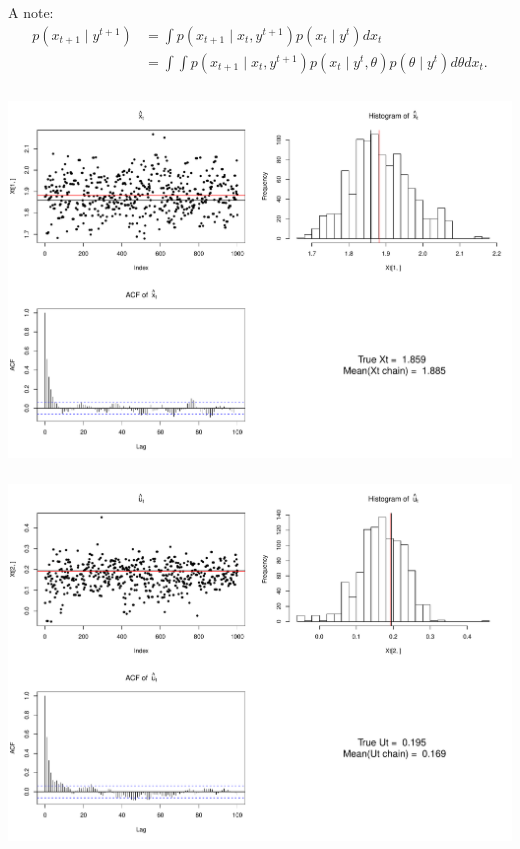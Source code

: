 A note: \begin{align*}
p(x_{t+1}\mid y^{t+1}) &= \int p(x_{t+1}\mid x_t, y^{t+1})p(x_t\mid y^t)dx_t \\
&= \int\int p(x_{t+1}\mid x_t, y^{t+1})p(x_t\mid y^t,\theta) p(\theta\mid y^t)d\theta dx_t. 
\end{align*}


%
%


\centering
\includegraphics[width=16cm,height=10cm]{Chapters/5.MCMCOU/plots/MCMCxt}
\includegraphics[width=16cm,height=10cm]{Chapters/5.MCMCOU/plots/MCMCut}
